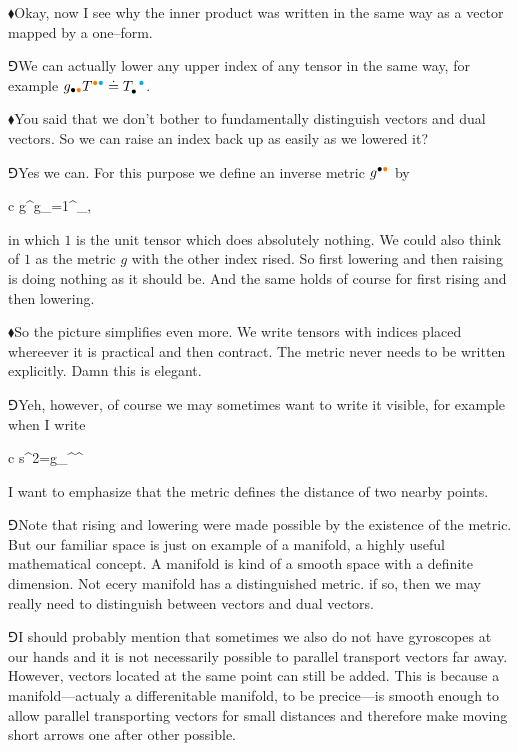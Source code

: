 \documentclass[11pt,oneside%
]{memoir}
\newenvironment{eqna}{\begin{IEEEeqnarray*}{c}}{\end{IEEEeqnarray*}\ignorespacesafterend}
\newcommand{\dd}{\mathrm{d}}
\renewcommand{\vec}[1]{\mathbf{#1}}
\newcommand{\tensay}[3]{#1_{#2}^{\phantom{#2}#3}}
\newcommand{\hea}{\(\blacklozenge\)\;}
\newcommand{\heb}{\(\Game\)\;}
\newcommand{\coa}{{\color{black}\bullet}}
\newcommand{\cob}{{\color{oranssi}\bullet}}
\newcommand{\coc}{{\color{cyan}\bullet}}
\begin{document}
\hea Okay, now I see why the inner product was written in the same way as a vector mapped by a one--form.

\heb We can actually lower any upper index of any tensor in the same way, for example \(g_{\coa\cob}T^{\cob\coc}\doteq\tensay{T}{\coa}{\coc}\).

\hea You said that we don't bother to fundamentally distinguish vectors and dual vectors. So we can raise an index back up as easily as we lowered it?

\heb Yes we can. For this purpose we define an inverse metric \(g^{\coa\cob}\) by
\begin{eqna}
    g^{\coa\cob}g_{\cob\coc}=1^{\coa}_{\coc},
\end{eqna}
in which \(1\) is the unit tensor which does absolutely nothing. We could also think of \(1\) as the metric \(g\) with the other index rised. So first lowering and then raising is doing nothing as it should be. And the same holds of course for first rising and then lowering.

\hea So the picture simplifies even more. We write tensors with indices placed whereever it is practical and then contract. The metric never needs to be written explicitly. Damn this is elegant.

\heb Yeh, however, of course we may sometimes want to write it visible, for example when I write
\begin{eqna}
    \dd s^2=g_{\coa\cob}\dd\vec{x}^\coa\dd\vec{x}^\cob
\end{eqna}
I want to emphasize that the metric defines the distance of two nearby points.

\heb Note that rising and lowering were made possible by the existence of the metric. But our familiar space is just on example of a manifold, a highly useful mathematical concept. A manifold is kind of a smooth space with a definite dimension. Not ecery manifold has a distinguished metric. if so, then we may really need to distinguish between vectors and dual vectors.

\heb I should probably mention that sometimes we also do not have gyroscopes at our hands and it is not necessarily possible to parallel transport vectors far away. However, vectors located at the same point can still be added. This is because a manifold---actualy a differenitable manifold, to be precice---is smooth enough to allow parallel transporting vectors for small distances and therefore make moving short arrows one after other possible.

\end{document}
